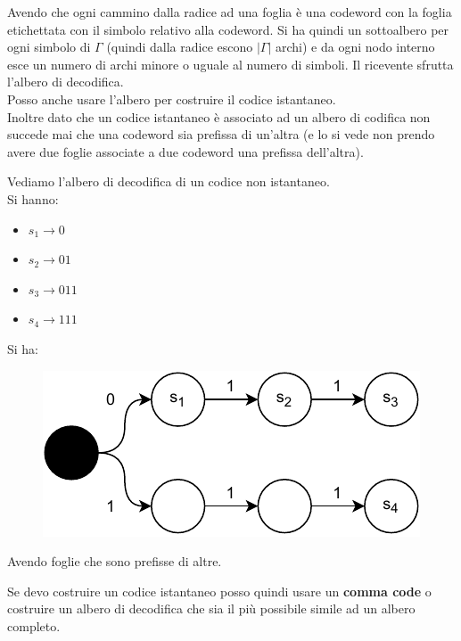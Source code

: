 \documentclass[a4paper,12pt, oneside]{book}
\begin{document}
Avendo che ogni cammino dalla radice ad una foglia è una codeword con la
foglia etichettata con il simbolo relativo alla codeword. Si ha quindi un
sottoalbero per ogni simbolo di $\Gamma$ (quindi dalla radice escono
$|\Gamma|$ archi) e da ogni nodo interno esce un numero
di archi minore o uguale al numero di simboli. Il ricevente sfrutta l'albero di
decodifica.\\ 
Posso anche usare l'albero per costruire il codice istantaneo.\\
Inoltre dato che un codice istantaneo è associato ad un albero di codifica non
succede mai che una codeword sia prefissa di un'altra (e lo si vede non prendo
avere due foglie associate a due codeword una prefissa dell'altra).
\begin{esempio}
  Vediamo l'albero di decodifica di un codice non istantaneo.\\
  Si hanno:
  \begin{itemize}
    \item $s_1\to 0$
    \item $s_2\to 01$
    \item $s_3\to 011$
    \item $s_4\to 111$
  \end{itemize}
  Si ha:
  \begin{figure}[H]
    \centering
    \includegraphics[scale = 0.8]{img/ct2.pdf}
  \end{figure}
  Avendo foglie che sono prefisse di altre.
\end{esempio}
Se devo costruire un codice istantaneo posso quindi usare un \textbf{comma code}
o costruire un albero di decodifica che sia il più possibile simile ad un albero
completo.
\end{document}
